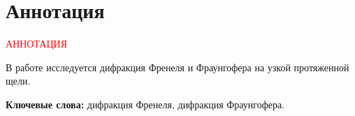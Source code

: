 \section*{Аннотация}

\Huge{\textcolor{red}{АННОТАЦИЯ}}

\normalsize

В работе исследуется дифракция Френеля и Фраунгофера на узкой протяженной щели. 

\textbf{Ключевые слова:} дифракция Френеля, дифракция Фраунгофера.